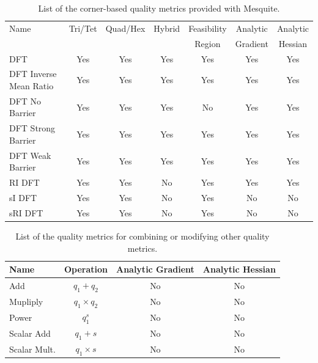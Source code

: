 \begin{table}[!hp]
\begin{center}
\begin{tabular}{|l|c|c|c|c|c|c|}
\hline
Name                   & Tri/Tet & Quad/Hex & Hybrid & Feasibility & Analytic & Analytic \\
                       &         &          &        & Region      & Gradient & Hessian  \\
\hline
DFT                    & Yes     & Yes      & Yes    & Yes         & Yes      & Yes      \\
DFT Inverse Mean Ratio & Yes     & Yes      & Yes    & Yes         & Yes      & Yes      \\
DFT No Barrier         & Yes     & Yes      & Yes    & No          & Yes      & Yes      \\
DFT Strong Barrier     & Yes     & Yes      & Yes    & Yes         & Yes      & Yes      \\
DFT Weak Barrier       & Yes     & Yes      & Yes    & Yes         & Yes      & Yes      \\
RI DFT                 & Yes     & Yes      & No     & Yes         & Yes      & Yes      \\
sI DFT                 & Yes     & Yes      & No     & Yes         & No       & No       \\
sRI DFT                & Yes     & Yes      & No     & Yes         & No       & No       \\
\hline
\end{tabular}
\label{Corner Metrics}
\caption{List of the corner-based quality metrics provided with Mesquite.}
\end{center}
\end{table}

\begin{table}[!hp]
\begin{center}
\begin{tabular}{|l|c|c|c|}
\hline
Name        & Operation        & Analytic Gradient & Analytic Hessian \\
\hline
Add         & $q_1 + q_2$      & No                & No               \\
Mupliply    & $q_1 \times q_2$ & No                & No               \\
Power       & $q_1^s$          & No                & No               \\
Scalar Add  & $q_1 + s$        & No                & No               \\
Scalar Mult.& $q_1 \times s$   & No                & No               \\
\hline
\end{tabular}
\label{Composite Metrics}
\caption{List of the quality metrics for combining or modifying other quality metrics.}
\end{center}
\end{table}


